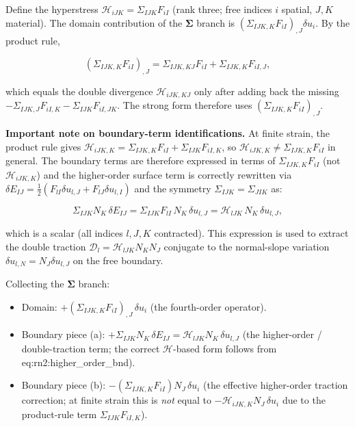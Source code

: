 \documentclass[11pt]{article}
\begin{document}
Define the hyperstress $\mathcal{H}_{iJK}=\Sigma_{IJK}F_{iI}$ (rank three; free indices $i$ spatial, $J,K$ material). The domain contribution of the $\boldsymbol{\Sigma}$ branch is $(\Sigma_{IJK,K}F_{iI})_{,J}\delta u_i$. By the product rule,

\begin{equation}
(\Sigma_{IJK,K}F_{iI})_{,J}=\Sigma_{IJK,KJ}F_{iI}+\Sigma_{IJK,K}F_{iI,J},
\label{rn2:hypdiv}
\end{equation}

which equals the double divergence $\mathcal{H}_{iJK,KJ}$ only after adding back the missing $-\Sigma_{IJK,J}F_{iI,K}-\Sigma_{IJK}F_{iI,JK}$. The strong form therefore uses $(\Sigma_{IJK,K}F_{iI})_{,J}$.

\textbf{Important note on boundary-term identifications.} At finite strain, the product rule gives $\mathcal{H}_{iJK,K}=\Sigma_{IJK,K}F_{iI}+\Sigma_{IJK}F_{iI,K}$, so $\mathcal{H}_{iJK,K}\neq\Sigma_{IJK,K}F_{iI}$ in general. The boundary terms are therefore expressed in terms of $\Sigma_{IJK,K}F_{iI}$ (not $\mathcal{H}_{iJK,K}$) and the higher-order surface term is correctly rewritten via $\delta E_{IJ}=\tfrac12(F_{lI}\delta u_{l,J}+F_{lJ}\delta u_{l,I})$ and the symmetry $\Sigma_{IJK}=\Sigma_{JIK}$ as:

\begin{equation}
\Sigma_{IJK}N_K\,\delta E_{IJ}
= \Sigma_{IJK}F_{lI}\,N_K\,\delta u_{l,J}
= \mathcal{H}_{lJK}\,N_K\,\delta u_{l,J},
\label{rn2:higher_order_bnd}
\end{equation}

which is a scalar (all indices $l,J,K$ contracted). This expression is used to extract the double traction $\mathcal{D}_l=\mathcal{H}_{lJK}N_KN_J$ conjugate to the normal-slope variation $\delta u_{l,N}=N_J\delta u_{l,J}$ on the free boundary.

Collecting the $\boldsymbol{\Sigma}$ branch:

\begin{itemize}
\item Domain: $+(\Sigma_{IJK,K}F_{iI})_{,J}\,\delta u_i$ (the fourth-order operator).

\item Boundary piece (a): $+\Sigma_{IJK}N_K\,\delta E_{IJ} = \mathcal{H}_{lJK}N_K\,\delta u_{l,J}$ (the higher-order / double-traction term; the correct $\mathcal{H}$-based form follows from eq:rn2:higher\_order\_bnd).

\item Boundary piece (b): $-(\Sigma_{IJK,K}F_{iI})N_J\,\delta u_i$ (the effective higher-order traction correction; at finite strain this is \emph{not} equal to $-\mathcal{H}_{iJK,K}N_J\,\delta u_i$ due to the product-rule term $\Sigma_{IJK}F_{iI,K}$).
\end{itemize}
\end{document}

